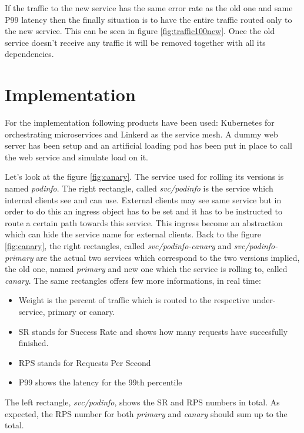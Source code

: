\documentclass[conference]{IEEEtran}
\begin{document}
    If the traffic to the new service has the same error rate as the old one and same P99 latency then the finally situation is to have the entire traffic routed only to the new service. This can be seen in figure \ref{fig:traffic100new}. Once the old service doesn't receive any traffic it will be removed together with all its dependencies.

\section{Implementation}
\label{sec:implementation}

    For the implementation following products have been used: Kubernetes \cite{b9} for orchestrating microservices and Linkerd \cite{b16} as the service mesh. A dummy web server has been setup and an artificial loading pod has been put in place to call the web service and simulate load on it.

    Let's look at the figure \ref{fig:canary}. The service used for rolling its versions is named \textit{podinfo}. The right rectangle, called \textit{svc/podinfo} is the service which internal clients see and can use. External clients may see same service but in order to do this an ingress object has to be set and it has to be instructed to route a certain path towards this service. This ingress become an abstraction which can hide the service name for external clients. Back to the figure \ref{fig:canary}, the right rectangles, called \textit{svc/podinfo-canary} and \textit{svc/podinfo-primary} are the actual two services which correspond to the two versions implied, the old one, named \textit{primary} and new one which the service is rolling to, called \textit{canary}. The same rectangles offers few more informations, in real time:

    \begin{itemize}
        \item Weight is the percent of traffic which is routed to the respective under-service, primary or canary.
        \item SR stands for Success Rate and shows how many requests have succesfully finished.
        \item RPS stands for Requests Per Second
        \item P99 shows the latency for the 99th percentile
    \end{itemize}

    The left rectangle, \textit{svc/podinfo}, shows the SR and RPS numbers in total. As expected, the RPS number for both \textit{primary} and \textit{canary} should sum up to the total.
\end{document}
